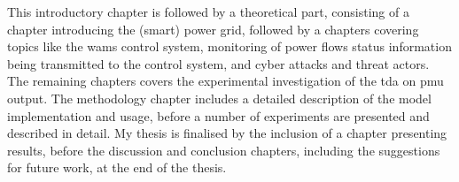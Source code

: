 This introductory chapter is followed by a theoretical part, consisting of a chapter introducing the (smart) power grid, followed by a chapters covering topics like the \acrshort{wams} control system, monitoring of power flows status information being transmitted to the control system, and cyber attacks and threat actors. 
The remaining chapters covers the experimental investigation of the \acrlong{tda} on \acrlong{pmu} output. The methodology chapter includes a detailed description of the model implementation and usage, before a number of experiments are presented and described in detail.
My thesis is finalised by the inclusion of a chapter presenting results, before the discussion and conclusion chapters, including the suggestions for future work, at the end of the thesis. 

